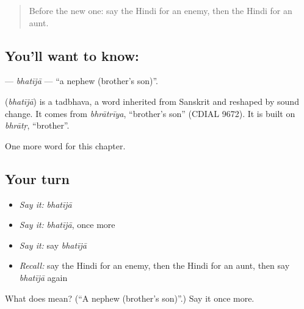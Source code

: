 \label{lesson:HI-C188-bhatija}



\begin{quote}
Before the new one: say the Hindi for an enemy, then the Hindi for an aunt.
\end{quote}

\subsection*{You'll want to know: }
\textbf{} — \emph{bhatījā} — \textquotedblleft{}a nephew (brother's son)\textquotedblright{}.

\begin{cousinweb}
\textbf{} (\emph{bhatījā}) is a tadbhava, a word inherited from Sanskrit and reshaped by sound change. It comes from \emph{bhrātrīya}, \textquotedblleft{}brother's son\textquotedblright{} (CDIAL 9672). It is built on \emph{bhrātṛ}, \textquotedblleft{}brother\textquotedblright{}.
\end{cousinweb}

\begin{grammarlens}[title={What you've built}]
One more word for this chapter.
\end{grammarlens}

\subsection*{Your turn}
\begin{itemize}
\raggedright
  \item \emph{Say it:} \emph{bhatījā}
  \item \emph{Say it:} \emph{bhatījā}, once more
  \item \emph{Say it:} say \emph{bhatījā}
  \item \emph{Recall:} say the Hindi for an enemy, then the Hindi for an aunt, then say \emph{bhatījā} again
\end{itemize}

\begin{tcolorbox}[breakable,colback=teal!4,colframe=teal!35!black,title={Before you move on}]
What does  mean? (\textquotedblleft{}A nephew (brother's son)\textquotedblright{}.) Say it once more.
\end{tcolorbox}
